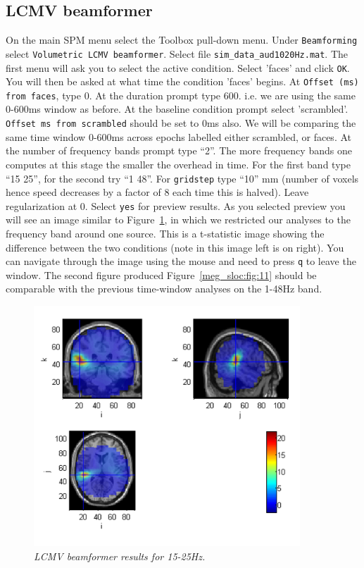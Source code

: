 \subsection{LCMV beamformer}
On the main SPM menu select the Toolbox pull-down menu. Under \texttt{Beamforming} select \texttt{Volumetric LCMV beamformer}.
Select file \texttt{sim\_data\_aud1020Hz.mat}.
The first menu will ask you to select the active condition. Select 'faces' and click \texttt{OK}. You will then be asked at what time the condition 'faces' begins.  At \texttt{Offset (ms) from faces}, type 0. At the duration prompt type 600. i.e. we are using the same 0-600ms window as before. At the baseline condition prompt select 'scrambled'. \texttt{Offset ms from scrambled} should be set to 0ms also. We will be comparing the same time window 0-600ms across epochs labelled either scrambled, or faces. At the number of frequency bands prompt type ``2''. The more frequency bands one computes at this stage the smaller the overhead in time. For the first band type ``15 25'', for the second try ``1 48''. For \texttt{gridstep} type ``10'' mm (number of voxels hence speed decreases by a factor of 8 each time this is halved). Leave regularization at 0. Select \texttt{yes} for preview results.
As you selected preview you will see an image similar to Figure~\ref{meg_sloc:fig:10}, in which we restricted our analyses to the frequency band around one source. This is a t-statistic image showing the difference between the two conditions (note in this image left is on right). You can navigate through the image using the mouse and need to press  \texttt{q} to leave the window. The second figure produced Figure~\ref{meg_sloc:fig:11} should be comparable with the previous time-window analyses on the 1-48Hz band. 

\begin{figure}
\begin{center}
\includegraphics[width=100mm]{meg_sloc/slide10}
\caption{\em LCMV beamformer results for 15-25Hz.\label{meg_sloc:fig:10}}
\end{center}
\end{figure}


